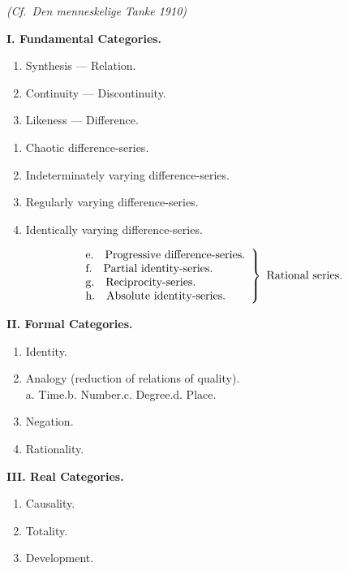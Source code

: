 \documentclass[12pt]{book}
\begin{document}
\begin{center}
\textit{(Cf.\ Den menneskelige Tanke 1910)}
\end{center}

\begingroup
{}

\noindent\textbf{I. Fundamental Categories.}
\begin{enumerate}[leftmargin=2.5em,itemsep=0pt,parsep=0pt,topsep=2pt]
\item Synthesis --- Relation.
\item Continuity --- Discontinuity.
\item Likeness --- Difference.
\end{enumerate}
\begin{enumerate}[leftmargin=4.5em,label=\alph*.,itemsep=0pt,parsep=0pt,topsep=1pt]
\item Chaotic difference-series.
\item Indeterminately varying difference-series.
\item Regularly varying difference-series.
\item Identically varying difference-series.
\end{enumerate}
\vspace{-2pt}
\[
\left.\begin{array}{l}
\text{e.\quad Progressive difference-series.}\\
\text{f.\quad Partial identity-series.}\\
\text{g.\quad Reciprocity-series.}\\
\text{h.\quad Absolute identity-series.}
\end{array}\right\}\ \text{Rational series.}
\]
\vspace{-6pt}

\noindent\textbf{II. Formal Categories.}
\begin{enumerate}[leftmargin=2.5em,itemsep=0pt,parsep=0pt,topsep=2pt]
\item Identity.
\item Analogy (reduction of relations of quality).\\
  \hspace*{1.5em} a. Time.\quad b. Number.\quad c. Degree.\quad d. Place.
\item Negation.
\item Rationality.
\end{enumerate}

\medskip

\noindent\textbf{III. Real Categories.}
\begin{enumerate}[leftmargin=2.5em,itemsep=0pt,parsep=0pt,topsep=2pt]
\item Causality.
\item Totality.
\item Development.
\end{enumerate}
\end{document}
